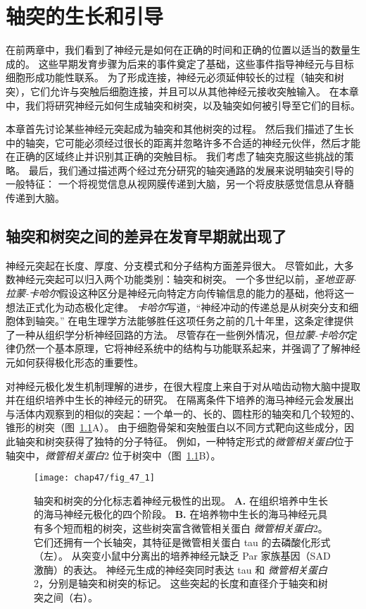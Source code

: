 \chapter{轴突的生长和引导} \label{chap:chap47}




在前两章中，我们看到了神经元是如何在正确的时间和正确的位置以适当的数量生成的。
这些早期发育步骤为后来的事件奠定了基础，这些事件指导神经元与目标细胞形成功能性联系。
为了形成连接，神经元必须延伸较长的过程（轴突和树突），它们允许与突触后细胞连接，并且可以从其他神经元接收突触输入。
在本章中，我们将研究神经元如何生成轴突和树突，以及轴突如何被引导至它们的目标。


本章首先讨论某些神经元突起成为轴突和其他树突的过程。
然后我们描述了生长中的轴突，它可能必须经过很长的距离并忽略许多不合适的神经元伙伴，然后才能在正确的区域终止并识别其正确的突触目标。
我们考虑了轴突克服这些挑战的策略。
最后，我们通过描述两个经过充分研究的轴突通路的发展来说明轴突引导的一般特征：
一个将视觉信息从视网膜传递到大脑，另一个将皮肤感觉信息从脊髓传递到大脑。



\section{轴突和树突之间的差异在发育早期就出现了}

神经元突起在长度、厚度、分支模式和分子结构方面差异很大。
尽管如此，大多数神经元突起可以归入两个功能类别：轴突和树突。
一个多世纪以前，\textit{圣地亚哥$\cdot$拉蒙-卡哈尔}假设这种区分是神经元向特定方向传输信息的能力的基础，他将这一想法正式化为动态极化定律。
\textit{卡哈尔}写道，“神经冲动的传递总是从树突分支和细胞体到轴突。” 
在电生理学方法能够胜任这项任务之前的几十年里，这条定律提供了一种从组织学分析神经回路的方法。
尽管存在一些例外情况，但\textit{拉蒙-卡哈尔}定律仍然一个基本原理，它将神经系统中的结构与功能联系起来，并强调了了解神经元如何获得极化形态的重要性。


对神经元极化发生机制理解的进步，在很大程度上来自于对从啮齿动物大脑中提取并在组织培养中生长的神经元的研究。
在隔离条件下培养的海马神经元会发展出与活体内观察到的相似的突起：一个单一的、长的、圆柱形的轴突和几个较短的、锥形的树突（图~\ref{fig:47_1}A）。
由于细胞骨架和突触蛋白以不同方式靶向这些成分，因此轴突和树突获得了独特的分子特征。
例如，一种特定形式的\textit{微管相关蛋白}位于轴突中，\textit{微管相关蛋白}2 位于树突中（图~\ref{fig:47_1}B）。


\begin{figure}[htbp]
	\centering
	\texttt{[image: chap47/fig\_47\_1]}
	\caption{轴突和树突的分化标志着神经元极性的出现。
		\textbf{A.} 在组织培养中生长的海马神经元极化的四个阶段\cite{kaech2006culturing}。
		\textbf{B.} 在培养物中生长的海马神经元具有多个短而粗的树突，这些树突富含微管相关蛋白 \textit{微管相关蛋白}2。
		它们还拥有一个长轴突，其特征是微管相关蛋白 tau 的去磷酸化形式（左）。
		从突变小鼠中分离出的培养神经元缺乏 Par 家族基因（SAD 激酶）的表达。
		神经元生成的神经突同时表达 tau 和 \textit{微管相关蛋白}2，分别是轴突和树突的标记。
		这些突起的长度和直径介于轴突和树突之间（右）\cite{kishi2005mammalian}。}
	\label{fig:47_1}
\end{figure}


